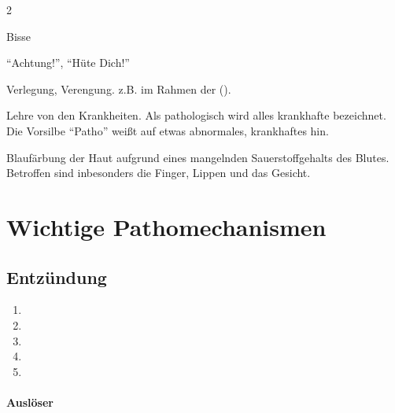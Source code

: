 \begin{multicols}{2}
\begin{compactdesc}
  \item[Bolus] Bisse
  \item[Cave] "`Achtung!"', "`Hüte Dich!"'
  \item[Obstruktion] Verlegung, Verengung. z.B. im Rahmen
  der ().
  \item[Organ] 
  \item[Pathologie, pathologisch, Patho-] Lehre von den
  Krankheiten. Als pathologisch wird alles krankhafte
  bezeichnet. Die Vorsilbe "`Patho"' weißt auf etwas
  abnormales, krankhaftes hin.
  \item[Zyanose] Blaufärbung der Haut aufgrund eines mangelnden
  Sauerstoffgehalts des Blutes. Betroffen sind inbesonders die Finger, Lippen
  und das Gesicht.
\end{compactdesc}


\end{multicols}









\section{Wichtige Pathomechanismen}

\subsection{Entzündung}
\label{topic:entzuendung}


\begin{enumerate}
    \item {}
    \item {}
    \item {}
    \item {}
    \item {}
\end{enumerate}

\paragraph{Ausl\"oser}

